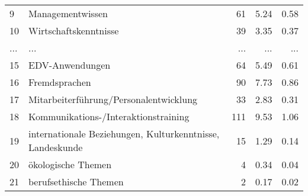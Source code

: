 \begin{longtable}{lXrrr}
        9 & \multicolumn{1}{X}{Managementwissen} & %
          \num{61} &
          \num[round-mode=places,round-precision=2]{5,24} &
          \num[round-mode=places,round-precision=2]{0,58} \\
        10 & \multicolumn{1}{X}{Wirtschaftskenntnisse} & %
          \num{39} &
          \num[round-mode=places,round-precision=2]{3,35} &
          \num[round-mode=places,round-precision=2]{0,37} \\
       ... & ... & ... & ... & ... \\
        15 & \multicolumn{1}{X}{EDV-Anwendungen} & %
          \num{64} &
          \num[round-mode=places,round-precision=2]{5,49} &
          \num[round-mode=places,round-precision=2]{0,61} \\

        16 & \multicolumn{1}{X}{Fremdsprachen} & %
          \num{90} &
          \num[round-mode=places,round-precision=2]{7,73} &
          \num[round-mode=places,round-precision=2]{0,86} \\

        17 & \multicolumn{1}{X}{Mitarbeiterführung/Personalentwicklung} & %
          \num{33} &
          \num[round-mode=places,round-precision=2]{2,83} &
          \num[round-mode=places,round-precision=2]{0,31} \\

        18 & \multicolumn{1}{X}{Kommunikations-/Interaktionstraining} & %
          \num{111} &
          \num[round-mode=places,round-precision=2]{9,53} &
          \num[round-mode=places,round-precision=2]{1,06} \\

        19 & \multicolumn{1}{X}{internationale Beziehungen, Kulturkenntnisse, Landeskunde} & %
          \num{15} &
          \num[round-mode=places,round-precision=2]{1,29} &
          \num[round-mode=places,round-precision=2]{0,14} \\

        20 & \multicolumn{1}{X}{ökologische Themen} & %
          \num{4} &
          \num[round-mode=places,round-precision=2]{0,34} &
          \num[round-mode=places,round-precision=2]{0,04} \\

        21 & \multicolumn{1}{X}{berufsethische Themen} & %
          \num{2} &
          \num[round-mode=places,round-precision=2]{0,17} &
          \num[round-mode=places,round-precision=2]{0,02} \\


\end{longtable}
